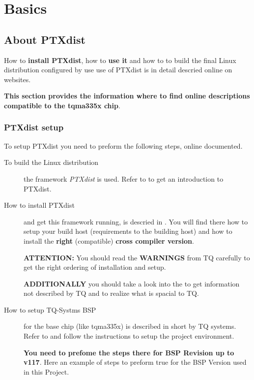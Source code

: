 

\chapter{Basics}%
\section{About PTXdist}%
\label{sec:linux_distribution_build}

How to \textbf{install PTXdist}, how to \textbf{use it} and how to to build the
final Linux distribution configured by use use of PTXdist is in detail descried
online on websites.

\textbf{This section provides the information where to find online descriptions
compatible to the tqma335x chip}.


\subsection{PTXdist setup}%
To setup PTXdist you need to preform the following steps, online documented.

\begin{description}
    \item[To build the Linux distribution] the framework \textit{PTXdist} is
        used. Refer to \newline \textbf{\cite{ptxdist}} to get an introduction
        to PTXdist.
    \item[How to install PTXdist] and get this framework running, is descried in
        \textbf{\cite{tq_bsp119_install}}. You will find there how to setup your
        build host (requirements to the building host) and how to install the
        \textbf{right} (compatible) \textbf{cross compiler version}.

        \textbf{ATTENTION:} You should read the \textbf{WARNINGS} from TQ
        carefully to get the right ordering of installation and setup.

        \textbf{ADDITIONALLY} you should take a look into the
        \textbf{\cite[PTXdist installation guide]{ptxdist_install} }
        to get information not described by TQ and to realize what is spacial
        to TQ.\@
    \item[How to setup TQ-Systms BSP] for the base chip (like tqma335x)
        is described in short by TQ systems. Refer to
        \textbf{\cite{tq_bsp119_configuration}} and follow the instructions to
        setup the project environment.

        \textbf{You need to prefome the steps there for BSP Revision up to
        v117}. Here an example of steps to preform true for the BSP Version used
        in this Project.
\end{description}

